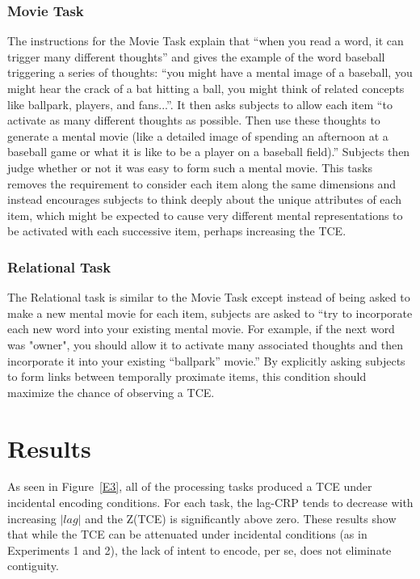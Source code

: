\documentclass[man,natbib,floatsintext]{apa6} %
\begin{document}
\subsubsection{Movie Task} The instructions for the Movie Task explain that ``when you read a word, it can trigger many different thoughts'' and gives the example of the word baseball triggering a series of thoughts: ``you might have a mental image of a baseball, you might hear the crack of a bat hitting a ball, you might think of related concepts like ballpark, players, and fans...''. It then asks subjects to allow each item ``to activate as many different thoughts as possible. Then use these thoughts to generate a mental movie (like a detailed image of spending an afternoon at a baseball game or what it is like to be a player on a baseball field).'' Subjects then judge whether or not it was easy to form such a mental movie. This tasks removes the requirement to consider each item along the same dimensions and instead encourages subjects to think deeply about the unique attributes of each item, which might be expected to cause very different mental representations to be activated with each successive item, perhaps increasing the TCE. 

\subsubsection{Relational Task} The Relational task is similar to the Movie Task except instead of being asked to make a new mental movie for each item, subjects are asked to ``try to incorporate each new word into your existing mental movie. For example, if the next word was "owner", you should allow it to activate many associated thoughts and then incorporate it into your existing ``ballpark'' movie.'' By explicitly asking subjects to form links between temporally proximate items, this condition should maximize the chance of observing a TCE. 

\section{Results}

As seen in Figure~\ref{E3}, all of the processing tasks produced a TCE under incidental encoding conditions. For each task, the lag-CRP tends to decrease with increasing $|lag|$ and the Z(TCE) is significantly above zero. These results show that while the TCE can be attenuated under incidental conditions (as in Experiments 1 and 2), the lack of intent to encode, per se, does not eliminate contiguity. 
\end{document}
